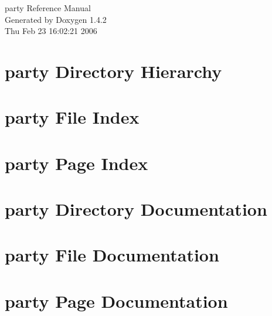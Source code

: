 \documentclass[a4paper]{book}
\begin{document}
\begin{titlepage}
\vspace*{7cm}
\begin{center}
{\Large party Reference Manual}\\
\vspace*{1cm}
{\large Generated by Doxygen 1.4.2}\\
\vspace*{0.5cm}
{\small Thu Feb 23 16:02:21 2006}\\
\end{center}
\end{titlepage}
\clearemptydoublepage
{}
\tableofcontents
\clearemptydoublepage
{}
\chapter{party Directory Hierarchy}

\chapter{party File Index}

\chapter{party Page Index}

\chapter{party Directory Documentation}

\chapter{party File Documentation}






























\chapter{party Page Documentation}

\printindex
\end{document}
